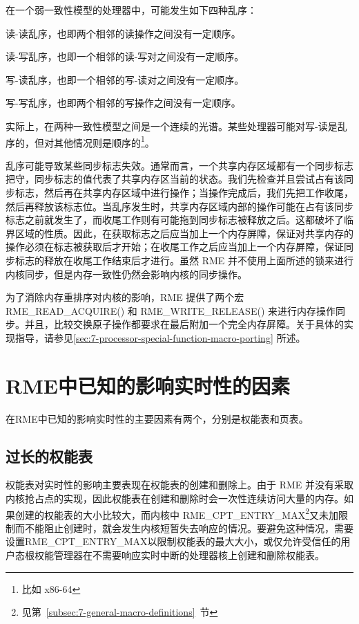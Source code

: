 在一个弱一致性模型的处理器中，可能发生如下四种乱序：

读-读乱序，也即两个相邻的读操作之间没有一定顺序。

读-写乱序，也即一个相邻的读-写对之间没有一定顺序。

写-读乱序，也即一个相邻的写-读对之间没有一定顺序。

写-写乱序，也即两个相邻的写操作之间没有一定顺序。

实际上，在两种一致性模型之间是一个连续的光谱。某些处理器可能对写-读是乱序的，但对其他情况则是顺序的\footnote{比如 x86-64}。

乱序可能导致某些同步标志失效。通常而言，一个共享内存区域都有一个同步标志把守，同步标志的值代表了共享内存区当前的状态。我们先检查并且尝试占有该同步标志，然后再在共享内存区域中进行操作；当操作完成后，我们先把工作收尾，然后再释放该标志位。当乱序发生时，共享内存区域内部的操作可能在占有该同步标志之前就发生了，而收尾工作则有可能拖到同步标志被释放之后。这都破坏了临界区域的性质。因此，在获取标志之后应当加上一个内存屏障，保证对共享内存的操作必须在标志被获取后才开始；在收尾工作之后应当加上一个内存屏障，保证同步标志的释放在收尾工作结束后才进行。虽然 RME 并不使用上面所述的锁来进行内核同步，但是内存一致性仍然会影响内核的同步操作。

为了消除内存重排序对内核的影响，RME 提供了两个宏 RME\_READ\_ACQUIRE() 和 RME\_WRITE\_RELEASE() 来进行内存操作同步。并且，比较交换原子操作都要求在最后附加一个完全内存屏障。关于具体的实现指导，请参见\ref{sec:7-processor-special-function-macro-porting}
所述。

\section{RME中已知的影响实时性的因素}\label{sec:9-realtime-influencing-factors}

在RME中已知的影响实时性的主要因素有两个，分别是权能表和页表。

\subsection{过长的权能表}\label{subsec:9-long-capability-table}

权能表对实时性的影响主要表现在权能表的创建和删除上。由于 RME 并没有采取内核抢占点的实现，因此权能表在创建和删除时会一次性连续访问大量的内存。如果创建的权能表的大小比较大，而内核中 RME\_CPT\_ENTRY\_MAX\footnote{见第~\ref{subsec:7-general-macro-definitions}~节}又未加限制而不能阻止创建时，就会发生内核短暂失去响应的情况。要避免这种情况，需要设置RME\_CPT\_ENTRY\_MAX以限制权能表的最大大小，或仅允许受信任的用户态根权能管理器在不需要响应实时中断的处理器核上创建和删除权能表。

